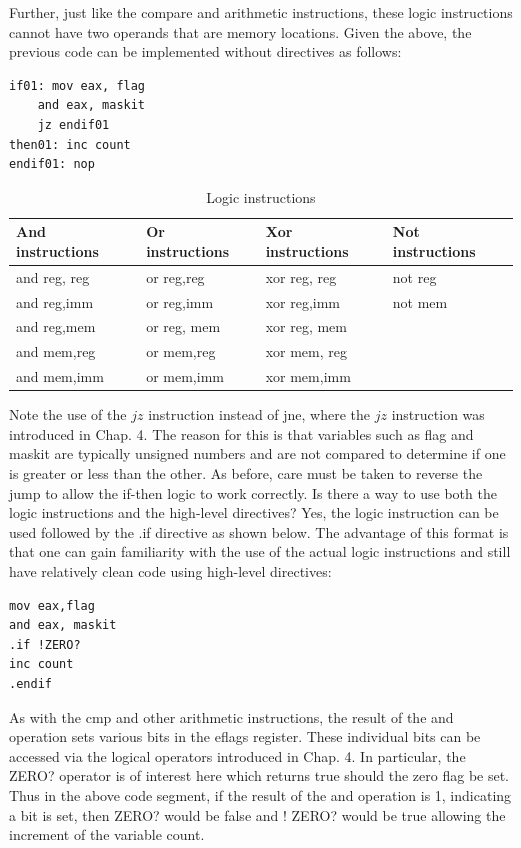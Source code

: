 \documentclass[10pt]{book}
\begin{document}
Further, just like the compare and arithmetic instructions, these logic instructions cannot have two operands that are memory locations. Given the above, the previous code can be implemented without directives as follows:

\begin{verbatim}
if01: mov eax, flag
    and eax, maskit
    jz endif01
then01: inc count
endif01: nop
\end{verbatim}

\begin{table}[h]
\centering
\caption{Logic instructions}
\begin{tabular}{|l|l|l|l|}
\hline
\textbf{And instructions} & \textbf{Or instructions} & \textbf{Xor instructions} & \textbf{Not instructions} \\
\hline
and reg, reg & or reg,reg & xor reg, reg & not reg \\
and reg,imm & or reg,imm & xor reg,imm & not mem \\
and reg,mem & or reg, mem & xor reg, mem &  \\
and mem,reg & or mem,reg & xor mem, reg &  \\
and mem,imm & or mem,imm & xor mem,imm &  \\
\hline
\end{tabular}
\end{table}

Note the use of the $j z$ instruction instead of jne, where the $j z$ instruction was introduced in Chap. 4. The reason for this is that variables such as flag and maskit are typically unsigned numbers and are not compared to determine if one is greater or less than the other. As before, care must be taken to reverse the jump to allow the if-then logic to work correctly.
Is there a way to use both the logic instructions and the high-level directives? Yes, the logic instruction can be used followed by the .if directive as shown below. The advantage of this format is that one can gain familiarity with the use of the actual logic instructions and still have relatively clean code using high-level directives:

\begin{verbatim}
mov eax,flag
and eax, maskit
.if !ZERO?
inc count
.endif
\end{verbatim}

As with the cmp and other arithmetic instructions, the result of the and operation sets various bits in the eflags register. These individual bits can be accessed via the logical operators introduced in Chap. 4. In particular, the ZERO? operator is of interest here which returns true should the zero flag be set. Thus in the above code segment, if the result of the and operation is 1, indicating a bit is set, then ZERO? would be false and ! ZERO? would be true allowing the increment of the variable count.
\end{document}
